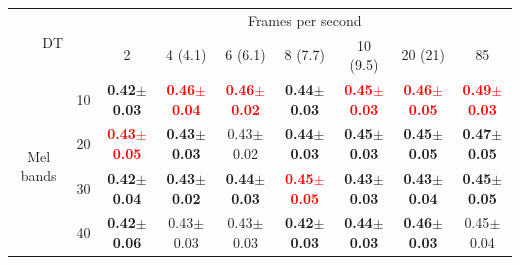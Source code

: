 \documentclass[final,3p,times,twocolumn]{elsarticle}
\begin{document}
\begin{table}[h]
\begin{tabular}{ll|c|c|c|c|c|c|c|} 
\cline{3-9}
\multicolumn{2}{c}{\multirow{2}{*}{DT}} & \multicolumn{7}{|c|}{Frames per second}\\ \cline{3-9}
 & & 2 & 4 (4.1) & 6 (6.1) & 8 (7.7) & 10 (9.5) & 20 (21) & 85 \\ \cline{1-9} 
\multicolumn{1}{|c}{\multirow{4}{*}{Mel bands}}
 & \multicolumn{1}{|c|}{10} & \textbf{0.42$\pm$0.03} & \textbf{\textcolor{red}{0.46$\pm$0.04}} & \textbf{\textcolor{red}{0.46$\pm$0.02}} & \textbf{0.44$\pm$0.03} & \textbf{\textcolor{red}{0.45$\pm$0.03}} & \textbf{\textcolor{red}{0.46$\pm$0.05}} & \textbf{\textcolor{red}{0.49$\pm$0.03}} \\ \cline{2-9}
\multicolumn{1}{|c}{}
 & \multicolumn{1}{|c|}{20} & \textbf{\textcolor{red}{0.43$\pm$0.05}} & \textbf{0.43$\pm$0.03} & 0.43$\pm$0.02 & \textbf{0.44$\pm$0.03} & \textbf{0.45$\pm$0.03} & \textbf{0.45$\pm$0.05} & \textbf{0.47$\pm$0.05} \\ \cline{2-9}
\multicolumn{1}{|c}{}
 & \multicolumn{1}{|c|}{30} & \textbf{0.42$\pm$0.04} & \textbf{0.43$\pm$0.02} & \textbf{0.44$\pm$0.03} & \textbf{\textcolor{red}{0.45$\pm$0.05}} & \textbf{0.43$\pm$0.03} & \textbf{0.43$\pm$0.04} & \textbf{0.45$\pm$0.05} \\ \cline{2-9}
\multicolumn{1}{|c}{}
 & \multicolumn{1}{|c|}{40} & \textbf{0.42$\pm$0.06} & 0.43$\pm$0.03 & 0.43$\pm$0.03 & \textbf{0.42$\pm$0.03} & \textbf{0.44$\pm$0.03} & \textbf{0.46$\pm$0.03} & 0.45$\pm$0.04 \\ \cline{1-9} 
\end{tabular} 


\end{table}
\end{document}
